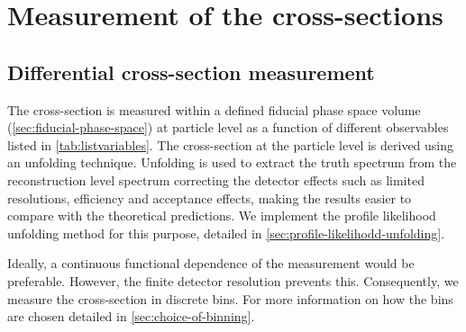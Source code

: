 
\chapter{Measurement of the \tty cross-sections} %
\label{Chapter3} %




\section{Differential cross-section measurement}
\label{sec:diff-xsec-measurement}
The cross-section is measured within a defined fiducial phase space volume (\cref{sec:fiducial-phase-space}) at particle level as a function of different observables listed in \cref{tab:listvariables}. The cross-section at the particle level is derived using an unfolding technique. Unfolding is used to extract the truth spectrum from the reconstruction level spectrum correcting the detector effects such as limited resolutions, efficiency and acceptance effects, making the results easier to compare with the theoretical predictions. We implement the profile likelihood unfolding method for this purpose, detailed in \cref{sec:profile-likelihodd-unfolding}. 

Ideally, a continuous functional dependence of the measurement would be preferable. However, the finite detector resolution prevents this. Consequently, we measure the cross-section in discrete bins. For more information on how the bins are chosen detailed in \cref{sec:choice-of-binning}.

